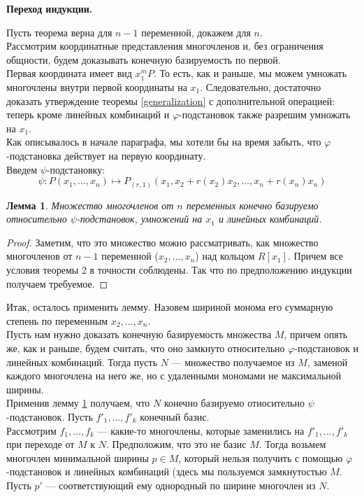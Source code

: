 \documentclass[12pt,a4paper]{article}
\newtheorem{lemma}{Лемма}[section]
\begin{document}
    \vskip 0.1in\noindent
    {\large\textbf{Переход индукции.}}

    Пусть теорема верна для $n-1$ переменной, докажем для $n$.\\
    Рассмотрим координатные представления многочленов и, без ограничения общности, будем доказывать конечную базируемость по первой.\\
    Первая координата имеет вид $x_1^m P$. То есть, как и раньше, мы можем умножать многочлены внутри первой координаты на $x_1$. Следовательно, достаточно доказать утверждение теоремы \ref{generalization} с дополнительной операцией: теперь кроме линейных комбинаций и $\varphi$-подстановок также разрешим умножать на $x_1$.\\
    Как описывалось в начале параграфа, мы хотели бы на время забыть, что $\varphi$-подстановка действует на первую координату. \\Введем $\psi$-подстановку:
    $$\psi : P(x_1,\ldots,x_n) \mapsto P_{(r,1)}(x_1,x_2+r(x_2)x_2,\ldots,x_n+r(x_n)x_n)$$\vskip 0.1in\noindent
    \begin{lemma}
        \label{ind_step}
        Множество многочленов от $n$ переменных конечно базируемо относительно $\psi$-подстановок, умножений на $x_1$ и линейных комбинаций.
    \end{lemma}
    \begin{proof}
        Заметим, что это множество можно рассматривать, как множество многочленов от $n-1$ переменной ($x_2,\ldots,x_n$) над кольцом $R[x_1]$. Причем все условия теоремы 2 в точности соблюдены. Так что по предположению индукции получаем требуемое.
    \end{proof}
    Итак, осталось применить лемму. Назовем шириной монома его суммарную степень по переменным $x_2,\ldots,x_n$.\\
    Пусть нам нужно доказать конечную базируемость множества $M$, причем опять же, как и раньше, будем считать, что оно замкнуто относительно $\varphi$-подстановок и линейных комбинаций. Тогда пусть $N$ --- множество получаемое из $M$, заменой каждого многочлена на него же, но с удаленными мономами не максимальной ширины.\\
    Применив лемму \ref{ind_step} получаем, что $N$ конечно базируемо относительно $\psi$-подстановок.
    Пусть $f'_1,\ldots,f'_k$ конечный базис.\\
    Рассмотрим $f_1,\ldots,f_k$ --- какие-то многочлены, которые заменились на $f'_1,\ldots,f'_k$ при переходе от $M$ к $N$. Предположим, что это не базис $M$. Тогда возьмем многочлен минимальной ширины $p\in M$, который нельзя получить с помощью $\varphi$-подстановок и линейных комбинаций (здесь мы пользуемся замкнутостью $M$. Пусть $p'$ --- соответствующий ему однородный по ширине многочлен из $N$.\\
\end{document}
